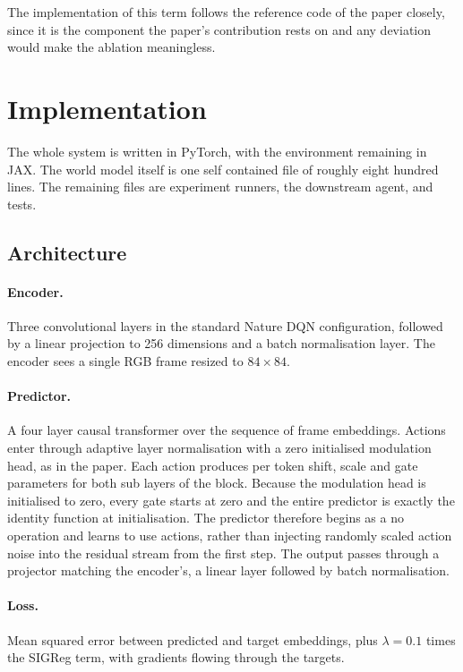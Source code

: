 \documentclass[11pt,a4paper]{article}
\begin{document}
The implementation of this term follows the reference code of the paper closely,
since it is the component the paper's contribution rests on and any deviation
would make the ablation meaningless.

\section{Implementation}

The whole system is written in PyTorch, with the environment remaining in JAX. The
world model itself is one self contained file of roughly eight hundred lines. The
remaining files are experiment runners, the downstream agent, and tests.

\subsection{Architecture}

\paragraph{Encoder.} Three convolutional layers in the standard Nature DQN
configuration, followed by a linear projection to 256 dimensions and a batch
normalisation layer. The encoder sees a single RGB frame resized to $84 \times 84$.

\paragraph{Predictor.} A four layer causal transformer over the sequence of frame
embeddings. Actions enter through adaptive layer normalisation with a zero
initialised modulation head, as in the paper. Each action produces per token shift,
scale and gate parameters for both sub layers of the block. Because the modulation
head is initialised to zero, every gate starts at zero and the entire predictor is
exactly the identity function at initialisation. The predictor therefore begins as
a no operation and learns to use actions, rather than injecting randomly scaled
action noise into the residual stream from the first step. The output passes
through a projector matching the encoder's, a linear layer followed by batch
normalisation.

\paragraph{Loss.} Mean squared error between predicted and target embeddings, plus
$\lambda = 0.1$ times the SIGReg term, with gradients flowing through the targets.
\end{document}

